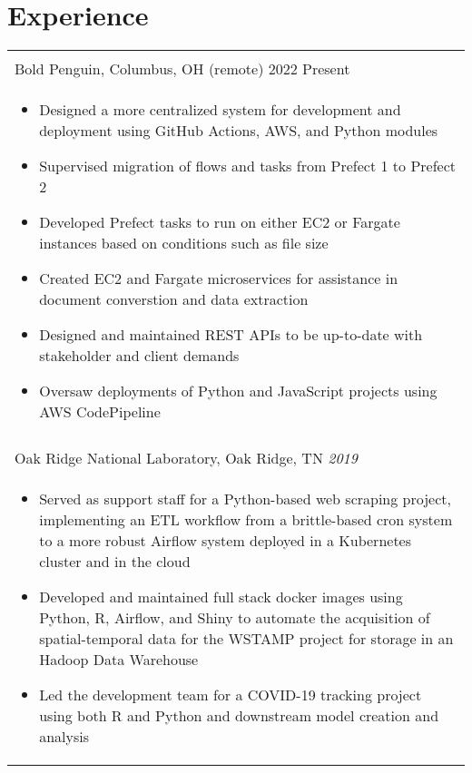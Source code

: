 \documentclass[10pt]{article}%
\begin{document}
\section*{\faCalendar{} Experience}
   \begin{tabularx}{\linewidth}{M}%
      \\
     Bold Penguin, Columbus, OH (remote) 2022\textemdash{} Present \\
     \begin{itemize}[topsep=-12pt,parsep=0em]
         \setlength\itemsep{0em}
         \item Designed a more centralized system for development and deployment using GitHub Actions, AWS, and Python modules %
         \item Supervised migration of flows and tasks from Prefect 1 to Prefect 2 %
         \item Developed Prefect tasks to run on either EC2 or Fargate instances based on conditions such as file size %
         \item Created EC2 and Fargate microservices for assistance in document converstion and data extraction %
         \item Designed and maintained REST APIs to be up-to-date with stakeholder and client demands %
         \item Oversaw deployments of Python and JavaScript projects using AWS CodePipeline %
     \end{itemize} \\
       \\
      Oak Ridge National Laboratory, Oak Ridge, TN \textit{2019} \\
      \begin{itemize}[topsep=-12pt,parsep=0em]
          \setlength\itemsep{0em}
          \item Served as support staff for a Python-based web scraping project, implementing an ETL workflow from a brittle-based cron system to a more robust Airflow system deployed in a Kubernetes cluster and in the cloud %
          \item Developed and maintained full stack docker images using Python, R, Airflow, and Shiny to automate the acquisition of spatial-temporal data for the WSTAMP project for storage in an Hadoop Data Warehouse %
          \item Led the development team for a COVID-19 tracking project using both R and Python and downstream model creation and analysis %

\end{itemize}
\end{tabularx}
\end{document}
